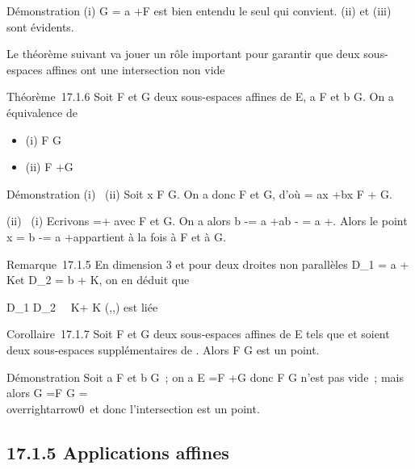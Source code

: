 \documentclass[]{article}
\begin{document}
Démonstration (i) G = a +\overrightarrow F est bien
entendu le seul qui convient. (ii) et (iii) sont évidents.

Le théorème suivant va jouer un rôle important pour garantir que deux
sous-espaces affines ont une intersection non vide

Théorème~17.1.6 Soit F et G deux sous-espaces affines de E, a \in F et b \in
G. On a équivalence de

\begin{itemize}
\itemsep1pt\parskip0pt
\item
  (i) F \bigcap G\neq~\varnothing~
\item
  (ii) \overrightarrowab
  \in\overrightarrow F
  +\overrightarrow G
\end{itemize}

Démonstration (i) \rigtharrow~(ii) Soit x \in F \bigcap G. On a donc
\overrightarrowax \in\overrightarrow
F et \overrightarrowxb
\in\overrightarrow G, d'où
\overrightarrowab =\overrightarrow
ax +\overrightarrow bx
\in\overrightarrow F +\overrightarrow
G.

(ii) \rigtharrow~(i) Ecrivons \overrightarrowab
=\overrightarrow \xi +\overrightarrow
\eta avec \overrightarrow\xi
\in\overrightarrow F et
\overrightarrow\eta \in\overrightarrow
G. On a alors b -\overrightarrow \eta = a
+\overrightarrow ab -\overrightarrow
\eta = a +\overrightarrow \xi. Alors le point x = b
-\overrightarrow \eta = a
+\overrightarrow \xi appartient à la fois à F et à G.

Remarque~17.1.5 En dimension 3 et pour deux droites non parallèles
D_1 = a + K\vecu et D_2 = b +
K\vecv, on en déduit que

D_1 \bigcap
D_2\neq~\varnothing~\mathrel\Leftrightarrow
\overrightarrowab \in K\vecu +
K\vecv \Leftrightarrow
(\overrightarrowab,\vecu,\vecv)\text
est liée 

Corollaire~17.1.7 Soit F et G deux sous-espaces affines de E tels que
\overrightarrowF et
\overrightarrowG soient deux sous-espaces
supplémentaires de \overrightarrowE. Alors F \bigcap G est
un point.

Démonstration Soit a \in F et b \in G~; on a
\overrightarrowab \in\overrightarrow
E =\overrightarrow F
+\overrightarrow G donc F \bigcap G n'est pas vide~; mais
alors \overrightarrowF \bigcap G
=\overrightarrow F \bigcap\overrightarrow
G =
\\overrightarrow0\
et donc l'intersection est un point.

\subsection{17.1.5 Applications affines}
\end{document}
